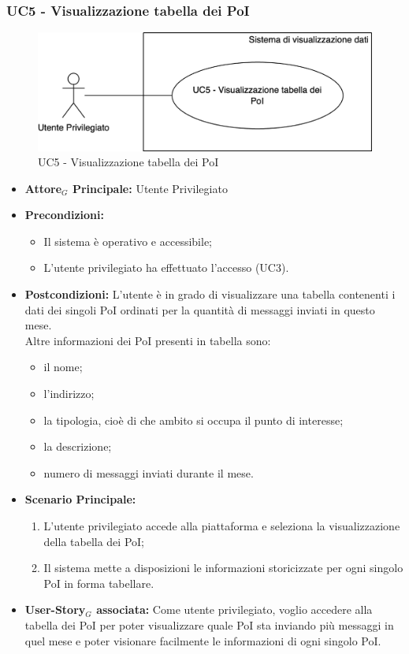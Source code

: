 \documentclass[11pt]{article}
\begin{document}
\begin{justify}
\subsubsection{\textbf{UC5 - Visualizzazione tabella dei PoI}}
\begin{figure}[H]
    \centering
    \includegraphics[width=0.7\linewidth]{UC5image.png}
    \caption{UC5 - Visualizzazione tabella dei PoI}
    \label{fig:UC5}
\end{figure}
\label{UC5}
\begin{itemize}
    \item \textbf{Attore$_G$ Principale:} Utente Privilegiato
    \item \textbf{Precondizioni:} 
        \begin{itemize}
          \item Il sistema è operativo e accessibile;
            \item L'utente privilegiato ha effettuato l'accesso (UC3).
        \end{itemize}
      \item \textbf{Postcondizioni:} L'utente è in grado di visualizzare una tabella contenenti i dati dei singoli PoI ordinati per la quantità di messaggi inviati in questo mese.\\
        Altre informazioni dei PoI presenti in tabella sono:
        \begin{itemize}
       \item il nome;
       \item l'indirizzo;
       \item la tipologia, cioè di che ambito si occupa il punto di interesse;
       \item la descrizione;
         \item numero di messaggi inviati durante il mese.
        \end{itemize}
    \item \textbf{Scenario Principale:} 
        \begin{enumerate}
        \item L'utente privilegiato accede alla piattaforma e seleziona la visualizzazione della tabella dei PoI;
          \item Il sistema mette a disposizioni le informazioni storicizzate per ogni singolo PoI in forma tabellare.
        \end{enumerate}
    \item \textbf{User-Story$_G$ associata:} Come utente privilegiato, voglio accedere alla tabella dei PoI per poter visualizzare quale PoI sta inviando più messaggi in quel mese e poter visionare facilmente le informazioni di ogni singolo PoI.
\end{itemize}


\end{justify}
\end{document}
